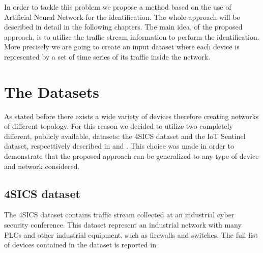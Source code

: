 In order to tackle this problem we propose a method based on the use of Artificial Neural Network for the identification. The whole approach will be described in detail in the following chapters. The main idea, of the proposed approach, is to utilize the traffic stream information to perform the identification. More precisely we are going to create an input dataset where each device is represented by a set of time series of its traffic inside the network. 

\section{The Datasets}\label{secdata}

As stated before there exists a wide variety of devices therefore creating networks of different topology. For this reason we decided to utilize two completely different, publicly available, datasets: the 4SICS dataset and the IoT Sentinel dataset, respecttively described in  and . This choice was made in order to demonstrate that the proposed approach can be generalized to any type of device and network considered.

\subsection{4SICS dataset}\label{4sics_sec}

The {4SICS dataset}\cite{4sics_site} contains traffic stream collected at an industrial cyber security conference. This dataset represent an industrial network with many PLCs and other industrial equipment, such as firewalls and switches. The full list of devices contained in the dataset is reported in 

